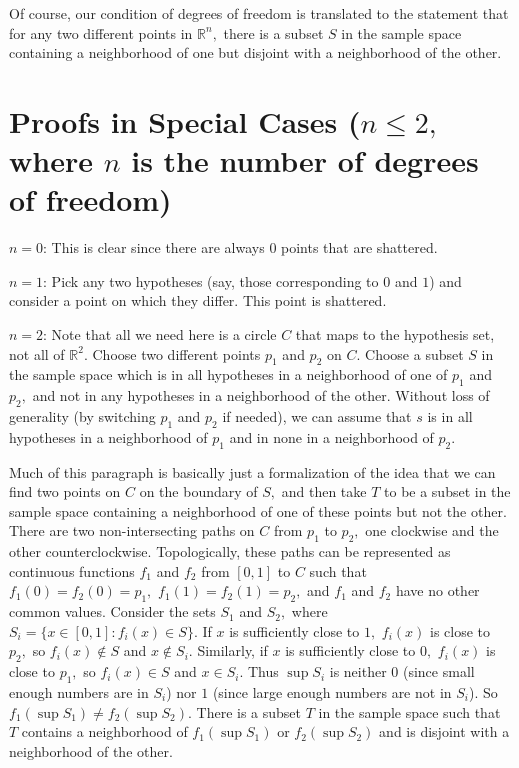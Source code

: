\documentclass[12pt]{amsart}
\newcommand{\0}{\mat{0}}
\newcommand{\1}{\mathds{1}}
\begin{document}
Of course, our condition of degrees of freedom is translated to the statement that for any two different points in $\mathbb{R}^n,$ there is a subset $S$ in the sample space containing a neighborhood of one but disjoint with a neighborhood of the other.

\section{Proofs in Special Cases ($n \le 2,$ where $n$ is the number of degrees of freedom)}

$n = 0$: This is clear since there are always $0$ points that are shattered.

$n = 1$: Pick any two hypotheses (say, those corresponding to $0$ and $1$) and consider a point on which they differ. This point is shattered.

$n = 2$: Note that all we need here is a circle $C$ that maps to the hypothesis set, not all of $\mathbb{R}^2.$ Choose two different points $p_1$ and $p_2$ on $C.$ Choose a subset $S$ in the sample space which is in all hypotheses in a neighborhood of one of $p_1$ and $p_2,$ and not in any hypotheses in a neighborhood of the other. Without loss of generality (by switching $p_1$ and $p_2$ if needed), we can assume that $s$ is in all hypotheses in a neighborhood of $p_1$ and in none in a neighborhood of $p_2.$

Much of this paragraph is basically just a formalization of the idea that we can find two points on $C$ on the boundary of $S,$ and then take $T$ to be a subset in the sample space containing a neighborhood of one of these points but not the other. There are two non-intersecting paths on $C$ from $p_1$ to $p_2,$ one clockwise and the other counterclockwise. Topologically, these paths can be represented as continuous functions $f_1$ and $f_2$ from $[0, 1]$ to $C$ such that $f_1(0) = f_2(0) = p_1,$ $f_1(1) = f_2(1) = p_2,$ and $f_1$ and $f_2$ have no other common values. Consider the sets $S_1$ and $S_2,$ where $S_i = \{x \in [0, 1] : f_i(x) \in S\}.$ If $x$ is sufficiently close to $1,$ $f_i(x)$ is close to $p_2,$ so $f_i(x) \notin S$ and $x \notin S_i.$ Similarly, if $x$ is sufficiently close to $0,$ $f_i(x)$ is close to $p_1,$ so $f_i(x) \in S$ and $x \in S_i.$ Thus $\sup S_i$ is neither $0$ (since small enough numbers are in $S_i$) nor $1$ (since large enough numbers are not in $S_i$). So $f_1(\sup S_1) \ne f_2(\sup S_2).$ There is a subset $T$ in the sample space such that $T$ contains a neighborhood of $f_1(\sup S_1)$ or $f_2(\sup S_2)$ and is disjoint with a neighborhood of the other.
\end{document}
